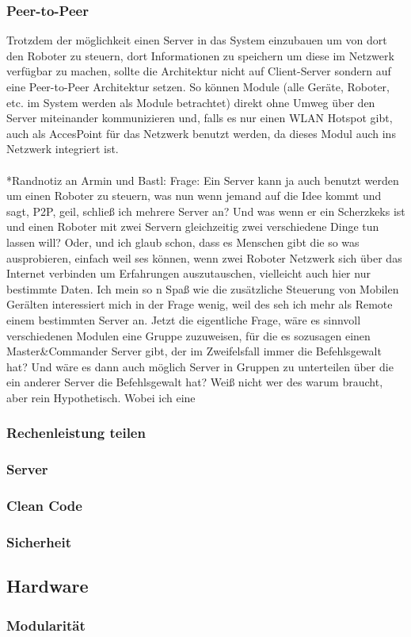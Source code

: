 \documentclass[11pt]{amsart}
\begin{document}
\subsubsection{Peer-to-Peer}
Trotzdem der m\"oglichkeit einen Server in das System einzubauen um von dort den Roboter zu steuern, dort Informationen zu speichern um diese im Netzwerk verf\"ugbar zu machen, sollte die Architektur nicht auf Client-Server sondern auf eine Peer-to-Peer Architektur setzen. So k\"onnen Module (alle Ger\"ate, Roboter, etc. im System werden als Module betrachtet) direkt ohne Umweg \"uber den Server miteinander kommunizieren und, falls es nur einen WLAN Hotspot gibt, auch als AccesPoint f\"ur das Netzwerk benutzt werden, da dieses Modul auch ins Netzwerk integriert ist.
\\
\\
*Randnotiz an Armin und Bastl:
Frage: Ein Server kann ja auch benutzt werden um einen Roboter zu steuern, was nun wenn jemand auf die Idee kommt und sagt, P2P, geil, schlie\ss{} ich  mehrere Server an? Und was wenn er ein Scherzkeks ist und einen Roboter mit zwei Servern gleichzeitig zwei verschiedene Dinge tun lassen will? Oder, und ich glaub schon, dass es Menschen gibt die so was ausprobieren, einfach weil ses k\"onnen, wenn zwei Roboter Netzwerk sich \"uber das Internet verbinden um Erfahrungen auszutauschen, vielleicht auch hier nur bestimmte Daten.  Ich mein so n Spa\ss{} wie die zus\"atzliche Steuerung von Mobilen Ger\"alten interessiert mich in der Frage wenig, weil des seh ich mehr als Remote einem bestimmten Server an. Jetzt die eigentliche Frage, w\"are es sinnvoll verschiedenen Modulen eine Gruppe zuzuweisen, f\"ur die es sozusagen einen Master\&Commander Server gibt, der im Zweifelsfall immer die Befehlsgewalt hat? Und w\"are es dann auch m\"oglich Server in Gruppen zu unterteilen \"uber die ein anderer Server die Befehlsgewalt hat? Wei\ss{} nicht wer des warum braucht, aber rein Hypothetisch. Wobei ich eine 
\subsubsection{Rechenleistung teilen}

\subsubsection{Server}
\subsubsection{Clean Code}
\subsubsection{Sicherheit}
\subsection{Hardware}

\subsubsection{Modularit\"at}
\end{document}
